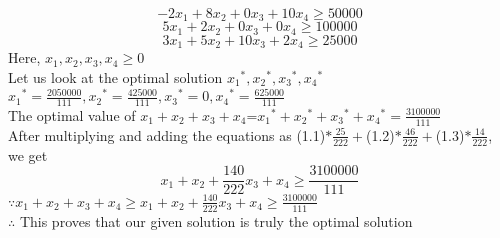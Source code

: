 \documentclass[twoside]{article}
\begin{document}
\begin{equation}
        -2x_1+8x_2+0x_3+10x_4 \geq 50000
\end{equation}
\begin{equation}
        5x_1+2x_2+0x_3+0x_4 \geq 100000
\end{equation}
\begin{equation}
        3x_1+5x_2+10x_3+2x_4 \geq 25000
\end{equation}
Here, $x_1,x_2,x_3,x_4 \geq 0$
\\ Let us look at the optimal solution ${x_1}^*,{x_2}^*,{x_3}^*,{x_4}^*$
\\${x_1}^*=\frac{2050000}{111},{x_2}^*=\frac{425000}{111},{x_3}^*=0,{x_4}^*=\frac{625000}{111}$
\\The optimal value of $x_1+x_2+x_3+x_4$=${x_1}^*+{x_2}^*+{x_3}^*+{x_4}^*=\frac{3100000}{111}$
\\After multiplying and adding the equations as (1.1)$*\frac{25}{222}+$(1.2)$*\frac{46}{222}+$(1.3)$*\frac{14}{222}$, we get
\begin{equation}
        x_1+x_2+\frac{140}{222}x_3+x_4 \geq \frac{3100000}{111}
\end{equation}
$\because x_1+x_2+x_3+x_4 \geq x_1+x_2+\frac{140}{222}x_3+x_4 \geq \frac{3100000}{111}$
\\ $\therefore$ This proves that our given solution is truly the optimal solution
\end{document}
